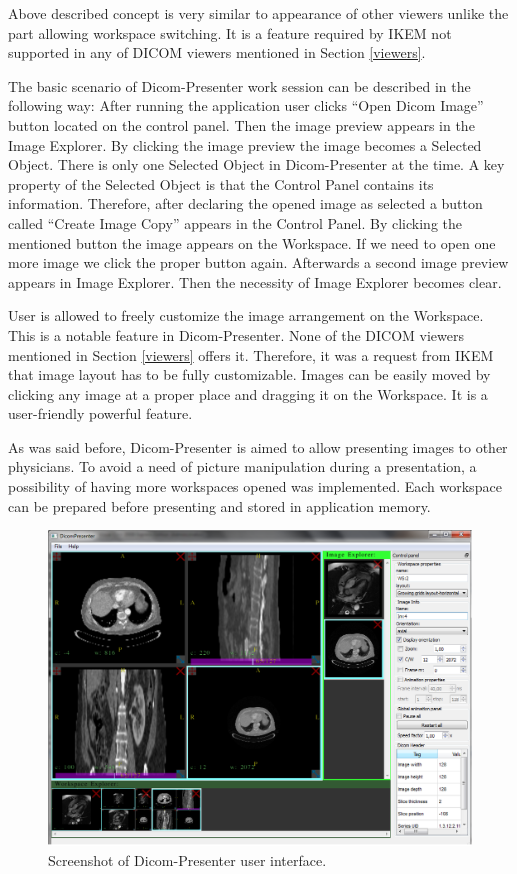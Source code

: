 Above described concept is very similar to appearance of other viewers unlike the part allowing workspace switching. It is a feature required by IKEM not supported in any of DICOM viewers mentioned in Section \ref{viewers}.

The basic scenario of Dicom-Presenter work session can be described in the following way: After running the application user clicks ``Open Dicom Image'' button located on the control panel. Then the image preview appears in the Image Explorer. By clicking the image preview the image becomes a Selected Object. There is only one Selected Object in Dicom-Presenter at the time. A key property of the Selected Object is that the Control Panel contains its information. Therefore, after declaring the opened image as selected a button called ``Create Image Copy'' appears in the Control Panel. By clicking the mentioned button the image appears on the Workspace. If we need to open one more image we click the proper button again. Afterwards a second image preview appears in Image Explorer. Then the necessity of Image Explorer becomes clear.

User is allowed to freely customize the image arrangement on the Workspace. This is a notable feature in Dicom-Presenter. None of the DICOM viewers mentioned in Section \ref{viewers} offers it. Therefore, it was a request from IKEM that image layout has to be fully customizable. Images can be easily moved  by clicking any image at a proper place and dragging it on the Workspace.  It is a user-friendly powerful feature.

As was said before, Dicom-Presenter is aimed to allow presenting images to other physicians. To avoid a need of picture manipulation during a presentation, a possibility of having more workspaces opened was implemented. Each workspace can be prepared before presenting and stored in application memory.
 
\begin{figure}
	\begin{center}
	\includegraphics[width=130mm]{Text/IMG/04_GUI_Screenshot.png}
	\end{center}
	\caption{Screenshot of Dicom-Presenter user interface.}
	\label{screenshot}
\end{figure}